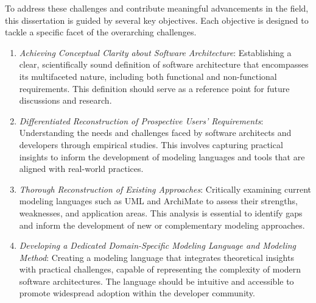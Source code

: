 To address these challenges and contribute meaningful advancements in the field, this dissertation is guided by several key objectives.
Each objective is designed to tackle a specific facet of the overarching challenges.
\begin{enumerate}
  \item \textit{Achieving Conceptual Clarity about Software Architecture}: Establishing a clear, scientifically sound definition of software architecture that encompasses its multifaceted nature, including both functional and non-functional requirements.
        This definition should serve as a reference point for future discussions and research.
  \item \textit{Differentiated Reconstruction of Prospective Users’ Requirements}: Understanding the needs and challenges faced by software architects and developers through empirical studies.
        This involves capturing practical insights to inform the development of modeling languages and tools that are aligned with real-world practices.
  \item \textit{Thorough Reconstruction of Existing Approaches}: Critically examining current modeling languages such as UML and ArchiMate to assess their strengths, weaknesses, and application areas.
        This analysis is essential to identify gaps and inform the development of new or complementary modeling approaches.
  \item \textit{Developing a Dedicated Domain-Specific Modeling Language and Modeling Method}: Creating a modeling language that integrates theoretical insights with practical challenges, capable of representing the complexity of modern software architectures.
        The language should be intuitive and accessible to promote widespread adoption within the developer community.
\end{enumerate}

